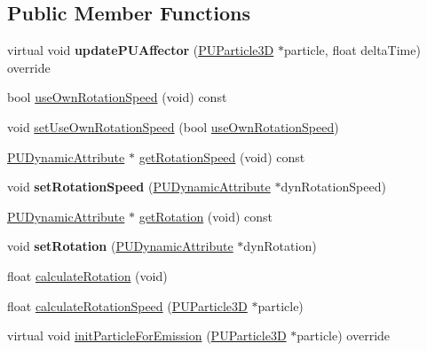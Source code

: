 \subsection*{Public Member Functions}
\begin{DoxyCompactItemize}
\item 
\mbox{\label{classPUTextureRotator_a19baf33caa5f30e28cf9fa5628b7157c}} 
virtual void {\bfseries update\+P\+U\+Affector} (\hyperlink{structPUParticle3D}{P\+U\+Particle3D} $\ast$particle, float delta\+Time) override
\item 
bool \hyperlink{classPUTextureRotator_a6438d215b7fb851bc898a4abc46b32f2}{use\+Own\+Rotation\+Speed} (void) const
\item 
void \hyperlink{classPUTextureRotator_a997bb8fc630de052732b14fdaa27943f}{set\+Use\+Own\+Rotation\+Speed} (bool \hyperlink{classPUTextureRotator_a6438d215b7fb851bc898a4abc46b32f2}{use\+Own\+Rotation\+Speed})
\item 
\hyperlink{classPUDynamicAttribute}{P\+U\+Dynamic\+Attribute} $\ast$ \hyperlink{classPUTextureRotator_a889b7bf2356133585da5094e4b8f8817}{get\+Rotation\+Speed} (void) const
\item 
\mbox{\label{classPUTextureRotator_a289238ab91afa975fcec34a2a1e4db3e}} 
void {\bfseries set\+Rotation\+Speed} (\hyperlink{classPUDynamicAttribute}{P\+U\+Dynamic\+Attribute} $\ast$dyn\+Rotation\+Speed)
\item 
\hyperlink{classPUDynamicAttribute}{P\+U\+Dynamic\+Attribute} $\ast$ \hyperlink{classPUTextureRotator_af9f390e83dd0aa9de85038af85bcf21b}{get\+Rotation} (void) const
\item 
\mbox{\label{classPUTextureRotator_af5894e792f088e32be17464273a1285c}} 
void {\bfseries set\+Rotation} (\hyperlink{classPUDynamicAttribute}{P\+U\+Dynamic\+Attribute} $\ast$dyn\+Rotation)
\item 
float \hyperlink{classPUTextureRotator_a0996de4263c286d134d4efb7d0c84329}{calculate\+Rotation} (void)
\item 
float \hyperlink{classPUTextureRotator_a7ffc7eb5ca88b68d6a8fc6d1ce9b8048}{calculate\+Rotation\+Speed} (\hyperlink{structPUParticle3D}{P\+U\+Particle3D} $\ast$particle)
\item 
virtual void \hyperlink{classPUTextureRotator_a1bdabd83e1037ac9ae50f10ddbfd3be5}{init\+Particle\+For\+Emission} (\hyperlink{structPUParticle3D}{P\+U\+Particle3D} $\ast$particle) override

\end{DoxyCompactItemize}
